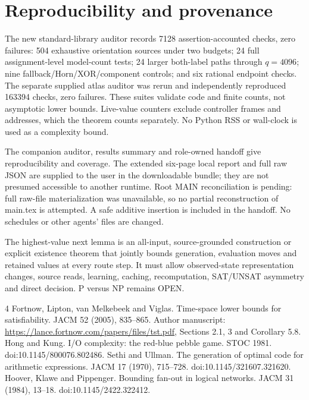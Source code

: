 \documentclass[11pt]{article}
\begin{document}
\section{Reproducibility and provenance}
The new standard-library auditor records 7128 assertion-accounted checks, zero failures: 504 exhaustive orientation sources under two budgets; 24 full assignment-level model-count tests; 24 larger both-label paths through $q=4096$; nine fallback/Horn/XOR/component controls; and six rational endpoint checks. The separate supplied atlas auditor was rerun and independently reproduced 163394 checks, zero failures. These suites validate code and finite counts, not asymptotic lower bounds. Live-value counters exclude controller frames and addresses, which the theorem counts separately. No Python RSS or wall-clock is used as a complexity bound.

The companion auditor, results summary and role-owned handoff give reproducibility and coverage. The extended six-page local report and full raw JSON are supplied to the user in the downloadable bundle; they are not presumed accessible to another runtime. Root MAIN reconciliation is pending: full raw-file materialization was unavailable, so no partial reconstruction of main.tex is attempted. A safe additive insertion is included in the handoff. No schedules or other agents' files are changed.

The highest-value next lemma is an all-input, source-grounded construction or explicit existence theorem that jointly bounds generation, evaluation moves and retained values at every route step. It must allow observed-state representation changes, source reads, learning, caching, recomputation, SAT/UNSAT asymmetry and direct decision. P versus NP remains OPEN.

\begin{thebibliography}{4}
 Fortnow, Lipton, van Melkebeek and Viglas. Time-space lower bounds for satisfiability. JACM 52 (2005), 835--865. Author manuscript: \url{https://lance.fortnow.com/papers/files/tst.pdf}, Sections 2.1, 3 and Corollary 5.8.
 Hong and Kung. I/O complexity: the red-blue pebble game. STOC 1981. doi:10.1145/800076.802486.
 Sethi and Ullman. The generation of optimal code for arithmetic expressions. JACM 17 (1970), 715--728. doi:10.1145/321607.321620.
 Hoover, Klawe and Pippenger. Bounding fan-out in logical networks. JACM 31 (1984), 13--18. doi:10.1145/2422.322412.
\end{thebibliography}
\end{document}
